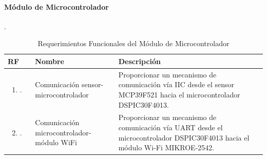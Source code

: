\paragraph{Módulo de Microcontrolador}.
\begin{longtable}{|M{1.6cm}|M{4.0cm}|M{6.0cm}|}
    \caption{Requerimientos Funcionales del Módulo de Microcontrolador}
	\hline
	\textbf{RF} & \textbf{Nombre} & \textbf{Descripción} \\ 
	\hline
 	\begin{enumerate}[label=RF\arabic*]
 	    \item.
 	\end{enumerate}
 	& Comunicación sensor-microcontrolador
 	& Proporcionar un mecanismo de comunicación vía IIC desde el sensor MCP39F521 hacia el microcontrolador DSPIC30F4013. \\
    \hline
    \begin{enumerate}[label=RF\arabic*]
        \setcounter{enumi}{1}
 	    \item.
 	\end{enumerate}
 	& Comunicación microcontrolador-módulo WiFi
 	& Proporcionar un mecanismo de comunicación vía UART desde el microcontrolador DSPIC30F4013 hacia el módulo Wi-Fi MIKROE-2542. \\
    \hline
\end{longtable}



